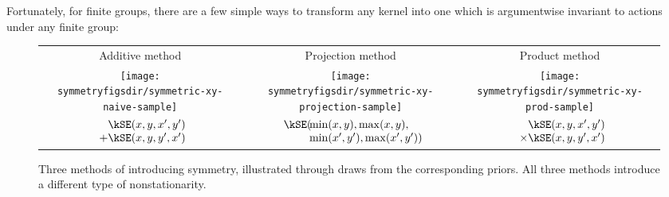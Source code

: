 Fortunately, for finite groups, there are a few simple ways to transform any kernel into one which is argumentwise invariant to actions under any finite group:
%
%
\begin{figure}
\renewcommand{\tabcolsep}{1.5mm}
\begin{tabular}{ccc}
Additive method & Projection method & Product method \\[0.5ex]
\texttt{[image: \\symmetryfigsdir/symmetric-xy-naive-sample]} &
\texttt{[image: \\symmetryfigsdir/symmetric-xy-projection-sample]} &
\texttt{[image: \\symmetryfigsdir/symmetric-xy-prod-sample]}\\
$\begin{array}{r@{}l@{}}
& \kSE(x, y, x', y') \\ + & \kSE(x, y, y', x')
\end{array}$
&
$\begin{array}{r@{}l@{}}
\kSE( \!\! &{}\min(x, y), \max(x,y), \\
           &{}\min(x', y'), \max(x',y') )
\end{array}$
&
$\begin{array}{r@{}l@{}}
& \kSE(x, y, x', y') \\ \times & \kSE(x, y, y', x') 
\end{array}$
\end{tabular}
\caption[Three ways to introduce symmetry]{Three methods of introducing symmetry, illustrated through draws from the corresponding priors.
All three methods introduce a different type of nonstationarity.
}
\label{fig:add_vs_min}
\end{figure}
%
